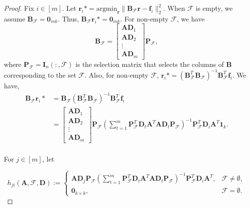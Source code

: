 \documentclass[journal,draftcls,onecolumn]{IEEEtran}
\theoremstyle{mystyle}
\newcommand{\bfr}{\mathbf{r}}
\newcommand{\bfD}{\mathbf{D}}
\newcommand{\bfA}{\mathbf{A}}
\newcommand{\bfB}{\mathbf{B}}
\newcommand{\cF}{\mathcal{F}}
\begin{document}

\begin{proof}
Fix $i \in [m]$. Let $\bfr_i* = \text{argmin}_{\mathbf{r}} \|\bfB_{\cF} \mathbf{r} - \mathbf{f}_i \|_2^2$. When $\cF$ is empty, we assume $\mathbf{B}_{\cF} = \mathbf{0}_{mk}$. Thus, $\mathbf{B}_{\cF}\mathbf{r}_i* = \mathbf{0}_{mk}$. For non-empty $\cF$, we have
\[ \bfB_{\cF} =\begin{bmatrix} \mathbf{A} \bfD_1 \\ \bfA \bfD_2\\ \vdots \\ \bfA\bfD_m\end{bmatrix} \mathbf{P}_{\mathcal{F}},\] 
where $\mathbf{P}_{\mathcal{F}} = \mathbf{I}_n(:, \mathcal{F})$ is the selection matrix that selects the columns of $\mathbf{B}$ corresponding to the set $\mathcal{F}$. Also, for non-empty $\cF$, $\bfr_i* = (\bfB_{\cF}^T\bfB_{\cF})^{-1} \bfB_{\cF}^T \mathbf{f}_i$. We have,  
\begin{align*} 
\bfB_{\cF} \bfr_i* &=  \bfB_{\cF}(\bfB_{\cF}^T\bfB_{\cF})^{-1} \bfB_{\cF}^T  \mathbf{f}_i\\ 
& = \begin{bmatrix} \mathbf{A} \bfD_1 \\ \bfA \bfD_2\\ \vdots \\ \bfA\bfD_m\end{bmatrix} \mathbf{P}_{\mathcal{F}} \left(\sum_{t=1}^m\mathbf{P}_{\mathcal{F}}^T \mathbf{D}_t\mathbf{A}^T\mathbf{A}\mathbf{D}_t \mathbf{P}_{\mathcal{F}}\right)^{-1}\mathbf{P}_{\mathcal{F}}^T \mathbf{D}_i \mathbf{A}^T \mathbf{1}_k.\\
\end{align*}

For $j \in [m]$, let 

\[
h_{ji}(\mathbf{A}, \mathcal{F}, \mathbf{D}) :=
\begin{cases}
\mathbf{A}\mathbf{D}_j\mathbf{P}_{\mathcal{F}}
\left(\sum_{t = 1}^m \mathbf{P}_{\mathcal{F}}^T \mathbf{D}_t \mathbf{A}^T \mathbf{A} \mathbf{D}_t \mathbf{P}_{\mathcal{F}}\right)^{-1}
\mathbf{P}_{\mathcal{F}}^T \mathbf{D}_i \mathbf{A}^T, & \mathcal{F} \neq \emptyset, \\[0.5em]
\mathbf{0}_{k \times k}, & \mathcal{F} = \emptyset.
\end{cases}
\]


\end{proof}
\end{document}
